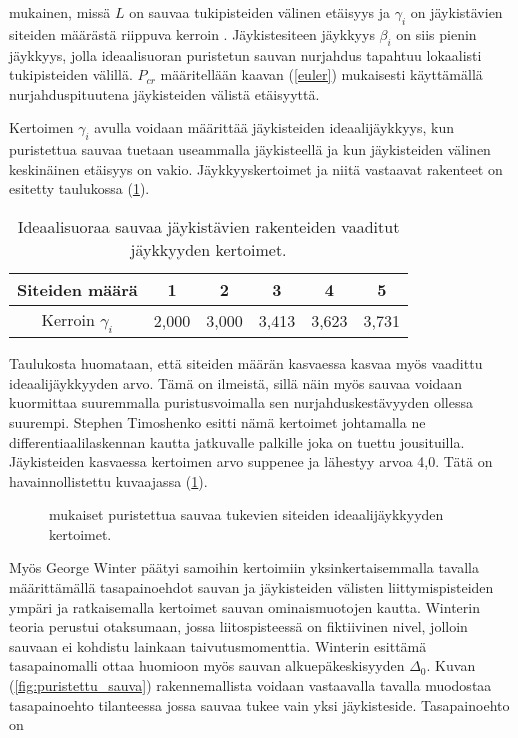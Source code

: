 \documentclass[12pt]{article}
\newenvironment{content}{\pagenumbering{arabic}}{}
\begin{document}
\begin{content}
mukainen, missä $L$ on sauvaa tukipisteiden välinen etäisyys ja $\gamma_i$ on jäykistävien siteiden määrästä riippuva kerroin \parencite[76]{timoshenko}. Jäykistesiteen jäykkyys $\beta_i$ on siis pienin jäykkyys, jolla ideaalisuoran puristetun sauvan nurjahdus tapahtuu lokaalisti tukipisteiden välillä. $P_{cr}$ määritellään kaavan (\ref{euler}) mukaisesti käyttämällä nurjahduspituutena jäykisteiden välistä etäisyyttä. 

Kertoimen $\gamma_i$ avulla voidaan määrittää jäykisteiden ideaalijäykkyys, kun puristettua sauvaa tuetaan useammalla jäykisteellä ja kun jäykisteiden välinen keskinäinen etäisyys on vakio. Jäykkyyskertoimet ja niitä vastaavat rakenteet on esitetty taulukossa (\ref{tab:ideaalijäykkyydet}).

\begin{table}[htb]
\centering
\caption{Ideaalisuoraa sauvaa jäykistävien rakenteiden vaaditut jäykkyyden kertoimet.}
\begin{tabular}{c c c c c c}
\label{tab:ideaalijäykkyydet}

Siteiden määrä & 1 & 2 & 3 & 4 & 5   \\
\hline
Kerroin $\gamma_i$ & 2,000 &3,000 & 3,413 & 3,623 & 3,731 
\end{tabular}
\end{table}

Taulukosta huomataan, että siteiden määrän kasvaessa kasvaa myös vaadittu ideaalijäykkyyden arvo. Tämä on ilmeistä, sillä näin myös sauvaa voidaan kuormittaa suuremmalla puristusvoimalla sen nurjahduskestävyyden ollessa suurempi. Stephen Timoshenko esitti nämä kertoimet \parencite{timoshenko} johtamalla ne differentiaalilaskennan kautta jatkuvalle palkille joka on tuettu jousituilla. Jäykisteiden kasvaessa kertoimen arvo suppenee ja lähestyy arvoa 4,0. Tätä on havainnollistettu kuvaajassa (\ref{fig:jäykkyyskertoimet}).

\begin{figure}[htb]

\caption{\parencite{timoshenko} mukaiset puristettua sauvaa tukevien siteiden ideaalijäykkyyden kertoimet. }
\label{fig:jäykkyyskertoimet}
\end{figure}

Myös George Winter päätyi samoihin kertoimiin \parencite{winter} yksinkertaisemmalla tavalla määrittämällä tasapainoehdot sauvan ja jäykisteiden välisten liittymispisteiden ympäri ja ratkaisemalla kertoimet sauvan ominaismuotojen kautta. Winterin teoria perustui otaksumaan, jossa liitospisteessä on fiktiivinen nivel, jolloin sauvaan ei kohdistu lainkaan taivutusmomenttia. Winterin esittämä tasapainomalli ottaa huomioon myös sauvan alkuepäkeskisyyden $\Delta_0$. Kuvan (\ref{fig:puristettu_sauva}) rakennemallista voidaan vastaavalla tavalla muodostaa tasapainoehto tilanteessa jossa sauvaa tukee vain yksi jäykisteside. Tasapainoehto on


\end{content}
\end{document}
